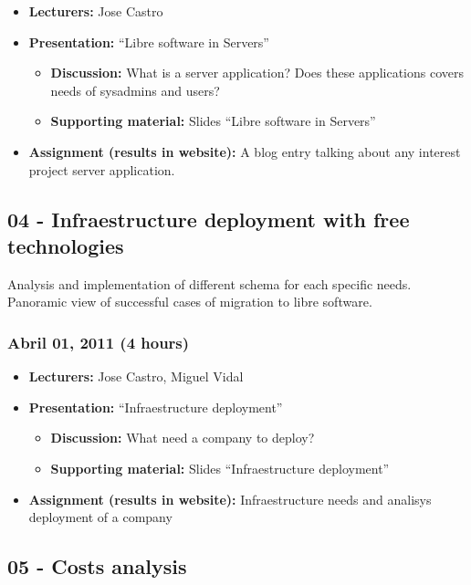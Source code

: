 \documentclass[a4paper]{article}
\begin{document}
\begin{itemize}
\item \textbf{Lecturers:} Jose Castro
\item \textbf{Presentation:} ``Libre software in Servers''
  \begin{itemize}
  \item \textbf{Discussion:} What is a server application? Does these applications covers needs of sysadmins and users?
  \item \textbf{Supporting material:} Slides ``Libre software in Servers''
  \end{itemize}
\item \textbf{Assignment (results in website):} A blog entry talking about any interest project server application.
\end{itemize}



\subsection{04 - Infraestructure deployment with free technologies}

Analysis and implementation of different schema for each specific needs. Panoramic view of successful cases of migration to libre software. 

\subsubsection{Abril 01, 2011 (4 hours)}


\begin{itemize}
\item \textbf{Lecturers:} Jose Castro, Miguel Vidal
\item \textbf{Presentation:} ``Infraestructure deployment''
  \begin{itemize}
  \item \textbf{Discussion:} What need a company to deploy?
  \item \textbf{Supporting material:} Slides ``Infraestructure deployment''
  \end{itemize}
\item \textbf{Assignment (results in website):} Infraestructure needs and analisys deployment of a company
\end{itemize}


\subsection{05 - Costs analysis }
\end{document}
